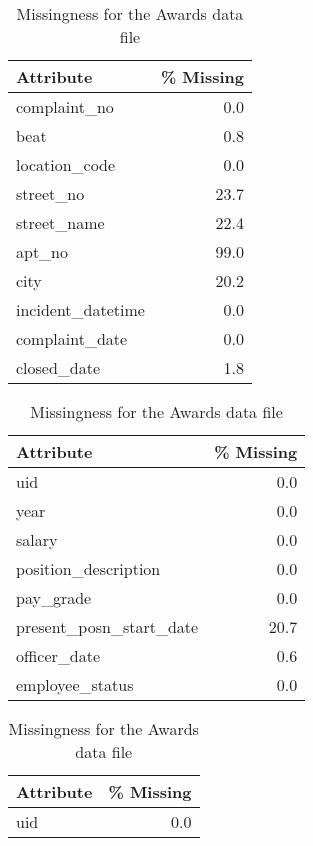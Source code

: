 \begin{table}
\begin{minipage}[t]{0.48\textwidth}
\centering 
\caption{Missingness for the Complaints data file}
\begin{tabular}{lr}
\toprule
        Attribute &  \% Missing \\
\midrule
     complaint\_no &        0.0 \\
             beat &        0.8 \\
    location\_code &        0.0 \\
        street\_no &       23.7 \\
      street\_name &       22.4 \\
           apt\_no &       99.0 \\
             city &       20.2 \\
incident\_datetime &        0.0 \\
   complaint\_date &        0.0 \\
      closed\_date &        1.8 \\
\bottomrule
\end{tabular}
\vspace{\baselineskip}
\caption{Missingness for the Salary data file}
\centering 
\begin{tabular}{lr}
\toprule
              Attribute &  \% Missing \\
\midrule
                    uid &        0.0 \\
                   year &        0.0 \\
                 salary &        0.0 \\
   position\_description &        0.0 \\
              pay\_grade &        0.0 \\
present\_posn\_start\_date &       20.7 \\
           officer\_date &        0.6 \\
        employee\_status &        0.0 \\
\bottomrule
\end{tabular}
\end{minipage}
\hfill\begin{minipage}[t]{0.48\textwidth}
\caption{Missingness for the Awards data file}
\centering 
\begin{tabular}{lr}
\toprule
               Attribute &  \% Missing \\
\midrule
                     uid &        0.0 \\

\end{tabular}
\end{minipage}
\end{table}
